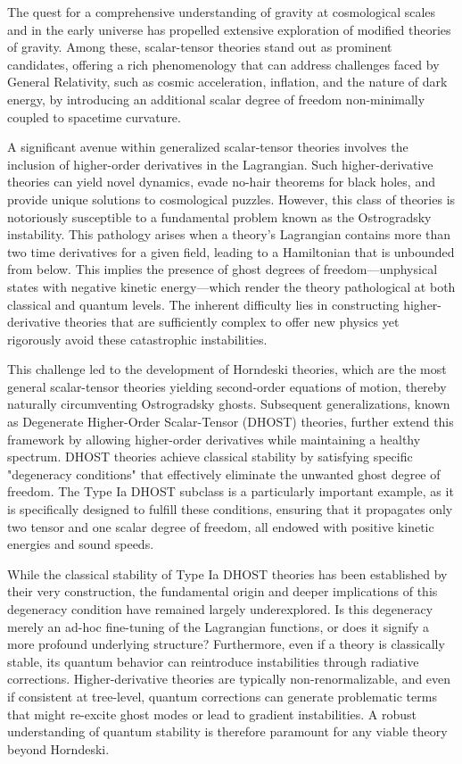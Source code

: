 \documentclass[twocolumn]{aastex631}
\begin{document}
The quest for a comprehensive understanding of gravity at cosmological scales and in the early universe has propelled extensive exploration of modified theories of gravity. Among these, scalar-tensor theories stand out as prominent candidates, offering a rich phenomenology that can address challenges faced by General Relativity, such as cosmic acceleration, inflation, and the nature of dark energy, by introducing an additional scalar degree of freedom non-minimally coupled to spacetime curvature.

A significant avenue within generalized scalar-tensor theories involves the inclusion of higher-order derivatives in the Lagrangian. Such higher-derivative theories can yield novel dynamics, evade no-hair theorems for black holes, and provide unique solutions to cosmological puzzles. However, this class of theories is notoriously susceptible to a fundamental problem known as the Ostrogradsky instability. This pathology arises when a theory's Lagrangian contains more than two time derivatives for a given field, leading to a Hamiltonian that is unbounded from below. This implies the presence of ghost degrees of freedom—unphysical states with negative kinetic energy—which render the theory pathological at both classical and quantum levels. The inherent difficulty lies in constructing higher-derivative theories that are sufficiently complex to offer new physics yet rigorously avoid these catastrophic instabilities.

This challenge led to the development of Horndeski theories, which are the most general scalar-tensor theories yielding second-order equations of motion, thereby naturally circumventing Ostrogradsky ghosts. Subsequent generalizations, known as Degenerate Higher-Order Scalar-Tensor (DHOST) theories, further extend this framework by allowing higher-order derivatives while maintaining a healthy spectrum. DHOST theories achieve classical stability by satisfying specific "degeneracy conditions" that effectively eliminate the unwanted ghost degree of freedom. The Type Ia DHOST subclass is a particularly important example, as it is specifically designed to fulfill these conditions, ensuring that it propagates only two tensor and one scalar degree of freedom, all endowed with positive kinetic energies and sound speeds.

While the classical stability of Type Ia DHOST theories has been established by their very construction, the fundamental origin and deeper implications of this degeneracy condition have remained largely underexplored. Is this degeneracy merely an ad-hoc fine-tuning of the Lagrangian functions, or does it signify a more profound underlying structure? Furthermore, even if a theory is classically stable, its quantum behavior can reintroduce instabilities through radiative corrections. Higher-derivative theories are typically non-renormalizable, and even if consistent at tree-level, quantum corrections can generate problematic terms that might re-excite ghost modes or lead to gradient instabilities. A robust understanding of quantum stability is therefore paramount for any viable theory beyond Horndeski.
\end{document}
